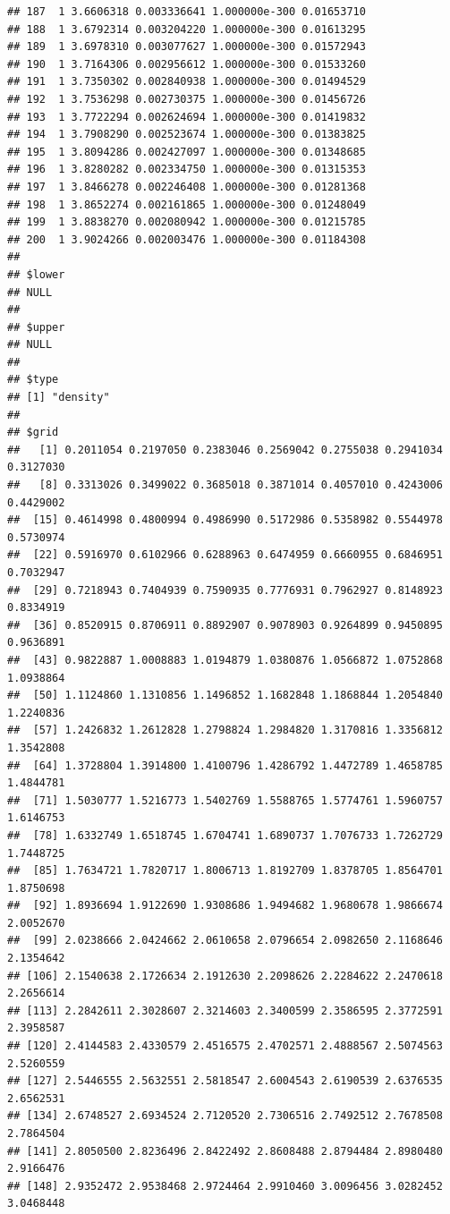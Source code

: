 \documentclass[article]{jss}\usepackage[]{graphicx}\usepackage[]{xcolor}
\makeatletter
\newenvironment{kframe}{%
 \def\at@end@of@kframe{}%
 \ifinner\ifhmode%
  \def\at@end@of@kframe{\end{minipage}}%
  \begin{minipage}{\columnwidth}%
 \fi\fi%
 \def\FrameCommand##1{\hskip\@totalleftmargin \hskip-\fboxsep
 \colorbox{shadecolor}{##1}\hskip-\fboxsep
     \hskip-\linewidth \hskip-\@totalleftmargin \hskip\columnwidth}%
 \MakeFramed {\advance\hsize-\width
   \@totalleftmargin\z@ \linewidth\hsize
   \@setminipage}}%
 {\par\unskip\endMakeFramed%
 \at@end@of@kframe}
\newenvironment{knitrout}{}{} %
\makeatother
\begin{document}
\begin{knitrout}
\begin{kframe}
\begin{verbatim}
## 187  1 3.6606318 0.003336641 1.000000e-300 0.01653710
## 188  1 3.6792314 0.003204220 1.000000e-300 0.01613295
## 189  1 3.6978310 0.003077627 1.000000e-300 0.01572943
## 190  1 3.7164306 0.002956612 1.000000e-300 0.01533260
## 191  1 3.7350302 0.002840938 1.000000e-300 0.01494529
## 192  1 3.7536298 0.002730375 1.000000e-300 0.01456726
## 193  1 3.7722294 0.002624694 1.000000e-300 0.01419832
## 194  1 3.7908290 0.002523674 1.000000e-300 0.01383825
## 195  1 3.8094286 0.002427097 1.000000e-300 0.01348685
## 196  1 3.8280282 0.002334750 1.000000e-300 0.01315353
## 197  1 3.8466278 0.002246408 1.000000e-300 0.01281368
## 198  1 3.8652274 0.002161865 1.000000e-300 0.01248049
## 199  1 3.8838270 0.002080942 1.000000e-300 0.01215785
## 200  1 3.9024266 0.002003476 1.000000e-300 0.01184308
## 
## $lower
## NULL
## 
## $upper
## NULL
## 
## $type
## [1] "density"
## 
## $grid
##   [1] 0.2011054 0.2197050 0.2383046 0.2569042 0.2755038 0.2941034 0.3127030
##   [8] 0.3313026 0.3499022 0.3685018 0.3871014 0.4057010 0.4243006 0.4429002
##  [15] 0.4614998 0.4800994 0.4986990 0.5172986 0.5358982 0.5544978 0.5730974
##  [22] 0.5916970 0.6102966 0.6288963 0.6474959 0.6660955 0.6846951 0.7032947
##  [29] 0.7218943 0.7404939 0.7590935 0.7776931 0.7962927 0.8148923 0.8334919
##  [36] 0.8520915 0.8706911 0.8892907 0.9078903 0.9264899 0.9450895 0.9636891
##  [43] 0.9822887 1.0008883 1.0194879 1.0380876 1.0566872 1.0752868 1.0938864
##  [50] 1.1124860 1.1310856 1.1496852 1.1682848 1.1868844 1.2054840 1.2240836
##  [57] 1.2426832 1.2612828 1.2798824 1.2984820 1.3170816 1.3356812 1.3542808
##  [64] 1.3728804 1.3914800 1.4100796 1.4286792 1.4472789 1.4658785 1.4844781
##  [71] 1.5030777 1.5216773 1.5402769 1.5588765 1.5774761 1.5960757 1.6146753
##  [78] 1.6332749 1.6518745 1.6704741 1.6890737 1.7076733 1.7262729 1.7448725
##  [85] 1.7634721 1.7820717 1.8006713 1.8192709 1.8378705 1.8564701 1.8750698
##  [92] 1.8936694 1.9122690 1.9308686 1.9494682 1.9680678 1.9866674 2.0052670
##  [99] 2.0238666 2.0424662 2.0610658 2.0796654 2.0982650 2.1168646 2.1354642
## [106] 2.1540638 2.1726634 2.1912630 2.2098626 2.2284622 2.2470618 2.2656614
## [113] 2.2842611 2.3028607 2.3214603 2.3400599 2.3586595 2.3772591 2.3958587
## [120] 2.4144583 2.4330579 2.4516575 2.4702571 2.4888567 2.5074563 2.5260559
## [127] 2.5446555 2.5632551 2.5818547 2.6004543 2.6190539 2.6376535 2.6562531
## [134] 2.6748527 2.6934524 2.7120520 2.7306516 2.7492512 2.7678508 2.7864504
## [141] 2.8050500 2.8236496 2.8422492 2.8608488 2.8794484 2.8980480 2.9166476
## [148] 2.9352472 2.9538468 2.9724464 2.9910460 3.0096456 3.0282452 3.0468448

\end{verbatim}
\end{kframe}
\end{knitrout}
\end{document}
